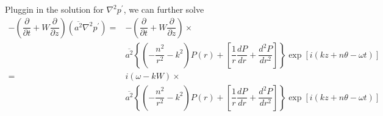 \documentclass[onecolumn,10pt]{jhwhw}
\begin{document}
Pluggin in the solution for $\nabla^2 p^{\prime}$, we can further solve
\begin{align*}
- \left ( \dfrac{\partial}{\partial t} + W \dfrac{\partial}{\partial z} \right) \left ( \overline{a^2} \nabla^2 p^{\prime} \right ) =& - \left ( \dfrac{\partial}{\partial t} + W \dfrac{\partial}{\partial z} \right) \times \\
& \overline{a^2} \left \{ \left ( -\dfrac{n^2}{r^2} -k^2 \right ) P(r) + \left [ \dfrac{1}{r} \dfrac{d P} {d r} + \dfrac{d^2 P} {d r^2} \right ] \right \} \exp[i(kz+n \theta - \omega t)] \\
=& i \left( \omega - k W \right) \times \\
& \overline{a^2} \left \{ \left ( -\dfrac{n^2}{r^2} -k^2 \right ) P(r) + \left [ \dfrac{1}{r} \dfrac{d P} {d r} + \dfrac{d^2 P} {d r^2} \right ] \right \} \exp[i(kz+n \theta - \omega t)]
\end{align*}
\end{document}
